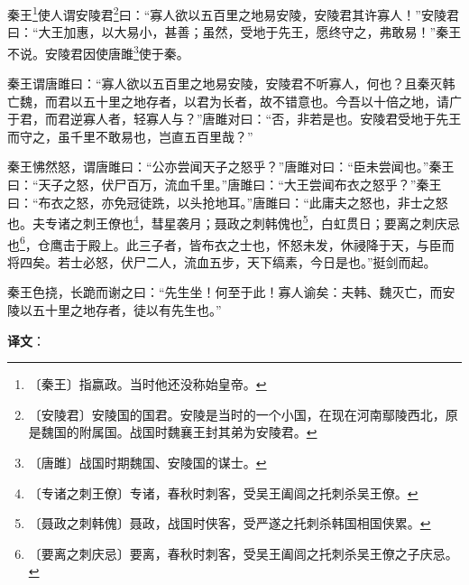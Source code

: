 \documentclass[12pt,UTF-8,openany,a4]{ctexbook}
\begin{document}
\begin{large}
    
    秦王\footnote{〔秦王〕\yiwen 指嬴政。当时他还没称始皇帝。}使人谓安陵君\footnote{〔安陵君〕\yiwen 安陵国的国君。安陵是当时的一个小国，在现在河南鄢陵西北，原是魏国的附属国。战国时魏襄王封其弟为安陵君。}曰：“寡人欲以五百里之地易安陵，安陵君其许寡人！”安陵君曰：“大王加惠，以大易小，甚善；虽然，受地于先王，愿终守之，弗敢易！”秦王不说。安陵君因使唐雎\footnote{〔唐雎〕\yiwen 战国时期魏国、安陵国的谋士。}使于秦。
    
    秦王谓唐雎曰：“寡人欲以五百里之地易安陵，安陵君不听寡人，何也？且秦灭韩亡魏，而君以五十里之地存者，以君为长者，故不错意也。今吾以十倍之地，请广于君，而君逆寡人者，轻寡人与？”唐雎对曰：“否，非若是也。安陵君受地于先王而守之，虽千里不敢易也，岂直五百里哉？”
    
    秦王怫然怒，谓唐雎曰：“公亦尝闻天子之怒乎？”唐雎对曰：“臣未尝闻也。”秦王曰：“天子之怒，伏尸百万，流血千里。”唐雎曰：“大王尝闻布衣之怒乎？”秦王曰：“布衣之怒，亦免冠徒跣，以头抢地耳。”唐雎曰：“此庸夫之怒也，非士之怒也。夫专诸之刺王僚也\footnote{〔专诸之刺王僚〕\yiwen 专诸，春秋时刺客，受吴王阖闾之托刺杀吴王僚。}，彗星袭月；聂政之刺韩傀也\footnote{〔聂政之刺韩傀〕\yiwen 聂政，战国时侠客，受严遂之托刺杀韩国相国侠累。}，白虹贯日；要离之刺庆忌也\footnote{〔要离之刺庆忌〕\yiwen 要离，春秋时刺客，受吴王阖闾之托刺杀吴王僚之子庆忌。}，仓鹰击于殿上。此三子者，皆布衣之士也，怀怒未发，休祲降于天，与臣而将四矣。若士必怒，伏尸二人，流血五步，天下缟素，今日是也。”挺剑而起。
    
    秦王色挠，长跪而谢之曰：“先生坐！何至于此！寡人谕矣：夫韩、魏灭亡，而安陵以五十里之地存者，徒以有先生也。”

\end{large}


\newpage

\begin{Large}
   \noindent \textbf{译文}：
\end{Large}

\vspace{1em}
\end{document}
